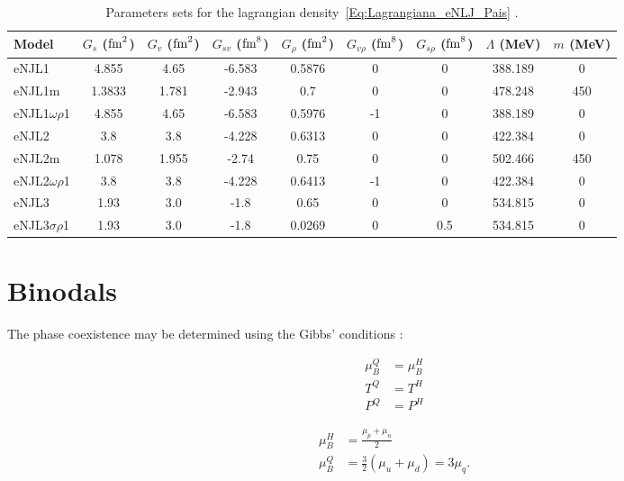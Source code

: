\documentclass[plainsections,a0]{sciposterlocal}
\begin{document}
\begin{multicols}{2}
\begin{table}
\centering
\caption{Parameters sets for the lagrangian density~\eqref{Eq:Lagrangiana_eNLJ_Pais} \cite{Pais2016}. \label{Tab:Parametros_eNJL}}
\begin{tabular}{lcccccccc}
\toprule
Model & $G_s$ ($\rm{fm}^2$) & $G_v$ ($\rm{fm}^2$) & $G_{sv}$ ($\rm{fm}^8$) & $G_\rho$ ($\rm{fm}^2$) & $G_{v\rho}$ ($\rm{fm}^8$) & $G_{s\rho}$ ($\rm{fm}^8$) & $\Lambda$ (MeV) & $m$ (MeV) \\
\midrule
eNJL1 & 4.855 & 4.65 & -6.583 & 0.5876 & 0 & 0 & 388.189 & 0 \\
eNJL1m & 1.3833 & 1.781 & -2.943 & 0.7 & 0 & 0 & 478.248 & 450 \\
eNJL1$\omega\rho$1 & 4.855 & 4.65 & -6.583 & 0.5976 & -1 & 0 & 388.189 & 0 \\
eNJL2 & 3.8 & 3.8 & -4.228 & 0.6313 & 0 & 0 & 422.384 & 0 \\
eNJL2m & 1.078 & 1.955 & -2.74 & 0.75 & 0 & 0 & 502.466 & 450 \\
eNJL2$\omega\rho$1 & 3.8 & 3.8 & -4.228 & 0.6413 & -1 & 0 & 422.384 & 0 \\
eNJL3 & 1.93 & 3.0 & -1.8 & 0.65 & 0 & 0 & 534.815 & 0 \\
eNJL3$\sigma\rho$1 & 1.93 & 3.0 & -1.8 & 0.0269 & 0 & 0.5 & 534.815 & 0 \\
\bottomrule
\end{tabular}
\end{table}

\columnbreak

\section*{Binodals}

The phase coexistence may be determined using the Gibbs' conditions \cite{Cavagnoli2011}:

\begin{minipage}{0.5\columnwidth}
\begin{align*}
\mu_B^Q &= \mu_B^H\\
T^Q &= T^H \\
P^Q &= P^H
\end{align*}
\end{minipage}
\begin{minipage}{0.5\columnwidth}
\begin{align*}
	\mu_B^H &= \frac{\mu_p + \mu_n}{2} \\
	\mu_B^Q &= \frac{3}{2} (\mu_u + \mu_d) = 3 \mu_q.
\end{align*}
\end{minipage}


\end{multicols}
\end{document}
